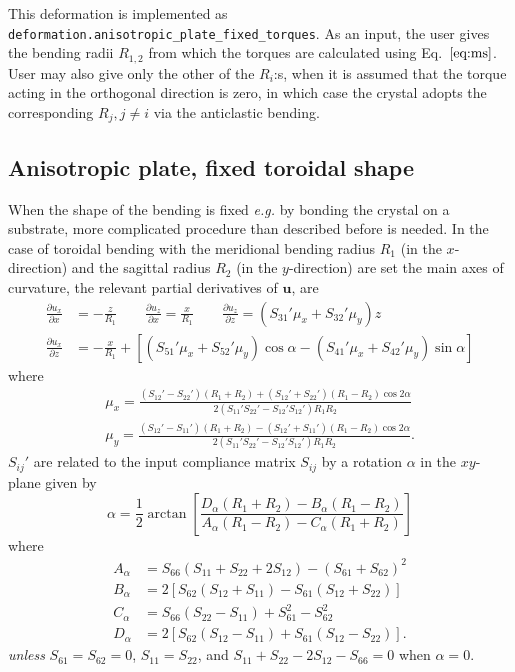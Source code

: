 \documentclass[11pt,a4paper]{article}
\begin{document}
This deformation is implemented as \texttt{deformation.anisotropic\_plate\_fixed\_torques}. As an input, the user gives the bending radii $R_{1,2}$ from which the torques are calculated using Eq.~$\eqref{eq:ms}$. User may also give only the other of the $R_i$:s, when it is assumed that the torque acting in the orthogonal direction is zero, in which case the crystal adopts the corresponding $R_j, j \neq i$ via the anticlastic bending.

\subsection{Anisotropic plate, fixed toroidal shape}
When the shape of the bending is fixed \emph{e.g.} by bonding the crystal on a substrate, more complicated procedure than described before is needed. In the case of toroidal bending with the meridional bending radius $R_1$ (in the $x$-direction) and the sagittal radius $R_2$ (in the $y$-direction) are set the main axes of curvature, the relevant partial derivatives of $\mathbf{u}$, are \cite{Honkanen_2020}
\begin{align}
\frac{\partial u_x}{\partial x} &= - \frac{z}{R_1} \qquad
\frac{\partial u_z}{\partial x} = \frac{x}{R_1} \qquad
\frac{\partial u_z}{\partial z} = \left(S_{31}' \mu_x + S_{32}' \mu_y \right) z \nonumber \\
\frac{\partial u_x}{\partial z} &= -\frac{x}{R_1} + \left[ 
\left(S_{51}' \mu_x + S_{52}' \mu_y \right) \cos \alpha
- \left(S_{41}' \mu_x + S_{42}' \mu_y \right) \sin \alpha
\right]
\end{align} 
where
\begin{align}
\mu_x = \frac{(S_{12}' - S_{22}')(R_1 + R_2) + (S_{12}' + S_{22}')(R_1 - R_2)\cos 2 \alpha}{2(S_{11}'S_{22}'  - S_{12}'S_{12}')R_1 R_2}\\
\mu_y = \frac{(S_{12}' - S_{11}')(R_1 + R_2) - (S_{12}' + S_{11}')(R_1 - R_2)\cos 2 \alpha}{2(S_{11}'S_{22}'  - S_{12}'S_{12}')R_1 R_2}.
\end{align}
$S_{ij}'$ are related to the input compliance matrix $S_{ij}$ by a rotation $\alpha$ in the $xy$-plane given by
\begin{equation}
\alpha = \frac{1}{2} \arctan \left[ \frac{D_\alpha(R_1 + R_2) - B_\alpha (R_1 - R_2)}{ A_\alpha (R_1 - R_2) - C_\alpha (R_1 + R_2) } \right]
\end{equation}
where
\begin{align}
A_\alpha &= S_{66} (S_{11} + S_{22} + 2 S_{12}) - (S_{61} + S_{62})^2 \\
B_\alpha &=  2\left[S_{62} (S_{12} + S_{11}) - S_{61} (S_{12} + S_{22}) \right]   \\
C_\alpha &= S_{66} (S_{22} - S_{11}) + S_{61}^2 - S_{62}^2  \\
D_\alpha &= 2\left[S_{62} (S_{12} - S_{11}) + S_{61} (S_{12} - S_{22}) \right].
\end{align}
\emph{unless} $S_{61} = S_{62} = 0$, $S_{11} = S_{22}$, and $S_{11} + S_{22} - 2 S_{12} - S_{66} = 0$ when $\alpha = 0$.
\end{document}
